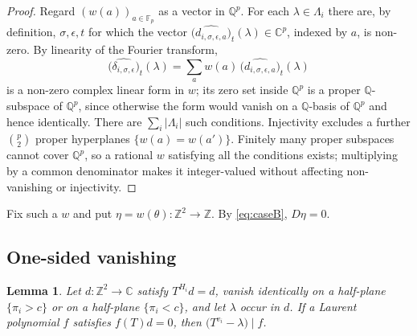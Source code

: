 \documentclass[11pt,reqno]{amsart}
\theoremstyle{plain}
\newtheorem{lem}[thm]{Lemma}
\theoremstyle{definition}
\theoremstyle{remark}
\theoremstyle{plain}
\theoremstyle{remark}
\theoremstyle{definition}
\numberwithin{equation}{section}
\newcommand{\Z}{\mathbb{Z}}
\newcommand{\C}{\mathbb{C}}
\newcommand{\Q}{\mathbb{Q}}
\newcommand{\Fp}{\mathbb{F}_p}
\begin{document}
\begin{proof}
Regard $(w(a))_{a\in\Fp}$ as a vector in $\Q^p$.  For each $\lambda\in\Lambda_i$
there are, by definition, $\sigma,\epsilon,t$ for which the vector
$\bigl(\widehat{d_{i,\sigma,\epsilon,a}}\bigr)_t(\lambda)\in\C^p$, indexed by
$a$, is non-zero.  By linearity of the Fourier transform,
\[\bigl(\widehat{\delta_{i,\sigma,\epsilon}}\bigr)_t(\lambda)
  =\sum_aw(a)\,\bigl(\widehat{d_{i,\sigma,\epsilon,a}}\bigr)_t(\lambda)\]
is a non-zero complex linear form in $w$; its zero set inside $\Q^p$ is a proper
$\Q$-subspace of $\Q^p$, since otherwise the form would vanish on a $\Q$-basis
of $\Q^p$ and hence identically.  There are $\sum_i|\Lambda_i|$ such conditions.
Injectivity excludes a further $\binom p2$ proper hyperplanes
$\{w(a)=w(a')\}$.  Finitely many proper subspaces cannot cover $\Q^p$, so a
rational $w$ satisfying all the conditions exists; multiplying by a common
denominator makes it integer-valued without affecting non-vanishing or
injectivity.
\end{proof}

Fix such a $w$ and put $\eta=w(\theta)\colon\Z^2\to\Z$.  By \eqref{eq:caseB},
$D\eta=0$.

\subsection{One-sided vanishing}\label{ssec:onesided}

\begin{lem}\label{lem:onesided}
Let $d\colon\Z^2\to\C$ satisfy $T^{H_i}d=d$, vanish identically on a half-plane
$\{\pi_i>c\}$ or on a half-plane $\{\pi_i<c\}$, and let $\lambda$ occur in $d$.
If a Laurent polynomial $f$ satisfies $f(T)d=0$, then
$\bigl(T^{v_i}-\lambda\bigr)\mid f$.
\end{lem}
\end{document}
